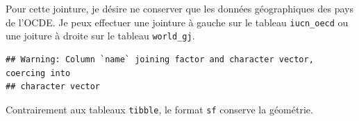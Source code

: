 \documentclass[]{book}
\newenvironment{Shaded}{\begin{snugshade}}{\end{snugshade}}
\newcommand{\DataTypeTok}[1]{\textcolor[rgb]{0.13,0.29,0.53}{#1}}
\newcommand{\KeywordTok}[1]{\textcolor[rgb]{0.13,0.29,0.53}{\textbf{#1}}}
\newcommand{\NormalTok}[1]{#1}
\newcommand{\OperatorTok}[1]{\textcolor[rgb]{0.81,0.36,0.00}{\textbf{#1}}}
\newcommand{\StringTok}[1]{\textcolor[rgb]{0.31,0.60,0.02}{#1}}
\begin{document}
\begin{Shaded}
\end{Shaded}

Pour cette jointure, je désire ne conserver que les données
géographiques des pays de l'OCDE. Je peux effectuer une jointure à
gauche sur le tableau \texttt{iucn\_oecd} ou une joiture à droite sur le
tableau \texttt{world\_gj}.

\begin{Shaded}
\end{Shaded}

\begin{verbatim}
## Warning: Column `name` joining factor and character vector, coercing into
## character vector
\end{verbatim}

Contrairement aux tableaux \texttt{tibble}, le format \texttt{sf}
conserve la géométrie.

\begin{Shaded}
\end{Shaded}
\end{document}
